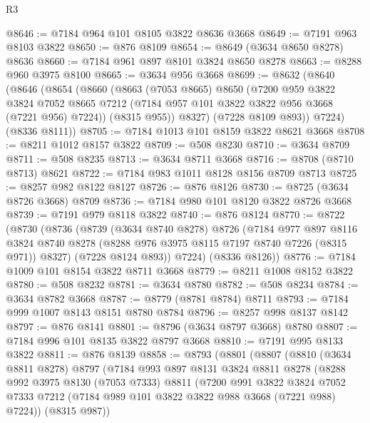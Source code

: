 \begin{lexlean}{R3}
\begin{coremodule}
@8646 := @7184 @964 @101 @8105 @3822 @8636 @3668
@8649 := @7191 @963 @8103 @3822
@8650 := @876 @8109
@8654 := @8649 (@3634 @8650 @8278) @8636
@8660 := @7184 @961 @897 @8101 @3824 @8650 @8278
@8663 := @8288 @960 @3975 @8100
@8665 := @3634 @956 @3668
@8699 := @8632
    (@8640
      (@8646
        (@8654
          (@8660
            (@8663
              (@7053 @8665)
              @8650
              (@7200
                @959
                @3822
                @3824
                @7052
                @8665
                @7212
                (@7184 @957 @101 @3822 @3822 @956 @3668 (@7221 @956) @7224))
              (@8315 @955))
            @8327)
          (@7228 @8109 @893))
        @7224)
      (@8336 @8111))
@8705 := @7184 @1013 @101 @8159 @3822 @8621 @3668
@8708 := @8211 @1012 @8157 @3822
@8709 := @508 @8230
@8710 := @3634 @8709
@8711 := @508 @8235
@8713 := @3634 @8711 @3668
@8716 := @8708 (@8710 @8713) @8621
@8722 := @7184 @983 @1011 @8128 @8156 @8709 @8713
@8725 := @8257 @982 @8122 @8127
@8726 := @876 @8126
@8730 := @8725 (@3634 @8726 @3668) @8709
@8736 := @7184 @980 @101 @8120 @3822 @8726 @3668
@8739 := @7191 @979 @8118 @3822
@8740 := @876 @8124
@8770 := @8722
    (@8730
      (@8736
        (@8739
          (@3634 @8740 @8278)
          @8726
          (@7184
            @977
            @897
            @8116
            @3824
            @8740
            @8278
            (@8288 @976 @3975 @8115 @7197 @8740 @7226 (@8315 @971))
            @8327)
          (@7228 @8124 @893))
        @7224)
      (@8336 @8126))
@8776 := @7184 @1009 @101 @8154 @3822 @8711 @3668
@8779 := @8211 @1008 @8152 @3822
@8780 := @508 @8232
@8781 := @3634 @8780
@8782 := @508 @8234
@8784 := @3634 @8782 @3668
@8787 := @8779 (@8781 @8784) @8711
@8793 := @7184 @999 @1007 @8143 @8151 @8780 @8784
@8796 := @8257 @998 @8137 @8142
@8797 := @876 @8141
@8801 := @8796 (@3634 @8797 @3668) @8780
@8807 := @7184 @996 @101 @8135 @3822 @8797 @3668
@8810 := @7191 @995 @8133 @3822
@8811 := @876 @8139
@8858 := @8793
    (@8801
      (@8807
        (@8810
          (@3634 @8811 @8278)
          @8797
          (@7184
            @993
            @897
            @8131
            @3824
            @8811
            @8278
            (@8288
              @992
              @3975
              @8130
              (@7053 @7333)
              @8811
              (@7200
                @991
                @3822
                @3824
                @7052
                @7333
                @7212
                (@7184 @989 @101 @3822 @3822 @988 @3668 (@7221 @988) @7224))
              (@8315 @987))

\end{coremodule}
\end{lexlean}
